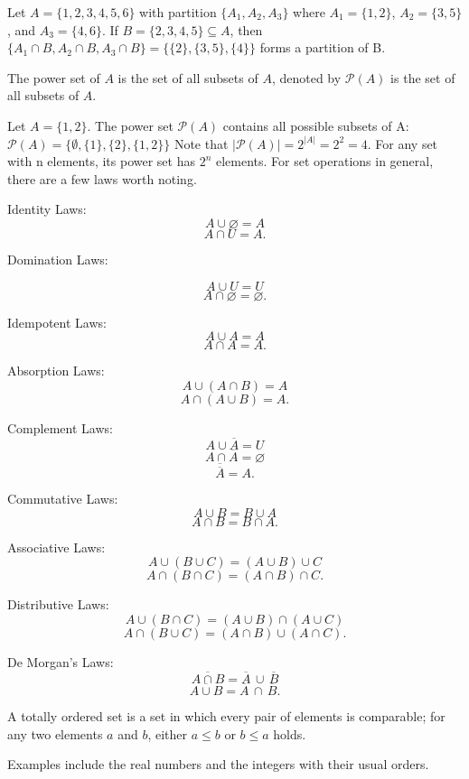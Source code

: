 \documentclass[12pt]{article}
\begin{document}
Let $A = \{1, 2, 3, 4, 5, 6\}$ with partition $\{A_1, A_2, A_3\}$ where $A_1 = \{1, 2\}$, $A_2 = \{3, 5\}$, and $A_3 = \{4, 6\}$. If $B = \{2, 3, 4, 5\} \subseteq A$, then $\{A_1 \cap B, A_2 \cap B, A_3 \cap B\} = \{\{2\}, \{3, 5\}, \{4\}\}$ forms a partition of B.





\begin{definition}
    The power set of $A$ is the set of all subsets of $A$, denoted by $\mathcal{P}(A)$ is the set of all subsets of $A$.
\end{definition}


Let $A = \{1, 2\}$. The power set $\mathcal{P}(A)$ contains all possible subsets of A:
$\mathcal{P}(A) = \{\emptyset, \{1\}, \{2\}, \{1, 2\}\}$
Note that $|\mathcal{P}(A)| = 2^{|A|} = 2^2 = 4$. For any set with n elements, its power set has $2^n$ elements. For set operations in general, there are a few laws worth noting.

Identity Laws:
$$
A \cup \varnothing = A$$$$ A \cap U = A.
$$

Domination Laws:

$$
A \cup U = U$$$$ A \cap \varnothing = \varnothing.
$$

Idempotent Laws:
$$
A \cup A = A$$$$ A \cap A = A.
$$

Absorption Laws:
$$
A \cup (A \cap B) = A$$$$ A \cap (A \cup B) = A.
$$

Complement Laws:
$$
A \cup \overline{A} = U$$$$ A \cap \overline{A} = \varnothing$$$$ \overline{\overline{A}} = A.
$$

Commutative Laws:
$$
A \cup B = B \cup A$$$$ A \cap B = B \cap A.
$$

Associative Laws:
$$
A \cup (B \cup C) = (A \cup B)\cup C$$$$ A \cap (B \cap C) = (A \cap B)\cap C.
$$

Distributive Laws:
$$
A \cup (B \cap C) = (A \cup B)\cap (A \cup C)$$$$
A \cap (B \cup C) = (A \cap B)\cup (A \cap C).
$$

De Morgan's Laws:
$$
\overline{A \cap B}=\overline{A}\,\cup\,\overline{B}$$$$
\overline{A \cup B}=\overline{A}\,\cap\,\overline{B}.
$$


\begin{definition}
A totally ordered set is a set in which every pair of elements is comparable; for any two elements $a$ and $b$, either $a \le b$ or $b \le a$ holds. 
\end{definition}

Examples include the real numbers and the integers with their usual orders.
\end{document}
